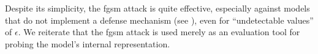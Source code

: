 Despite its simplicity, the \gls{fgsm} attack is quite effective, especially against models that do not implement a defense mechanism (see ), even for ``undetectable values'' of $\epsilon$. We reiterate that the \gls{fgsm} attack is used merely as an evaluation tool for probing the model's internal representation.
